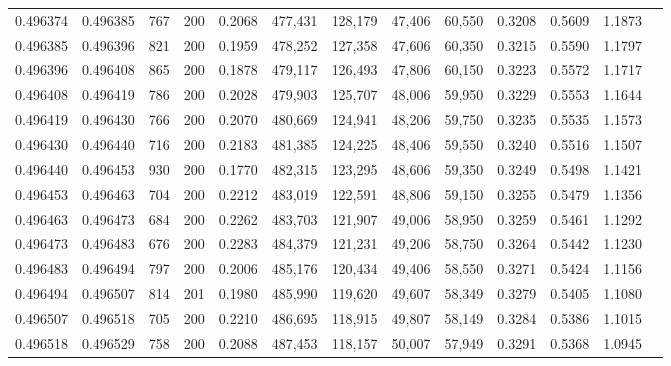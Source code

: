 \begin{tabular}{rrrrrrrrrrrrr}
0.496374 & 0.496385 &    767 & 200 &                                     0.2068 & 477,431 & 128,179 &  47,406 &  60,550 & 0.3208 & 0.5609 & 1.1873 \\
0.496385 & 0.496396 &    821 & 200 &                                     0.1959 & 478,252 & 127,358 &  47,606 &  60,350 & 0.3215 & 0.5590 & 1.1797 \\
0.496396 & 0.496408 &    865 & 200 &                                     0.1878 & 479,117 & 126,493 &  47,806 &  60,150 & 0.3223 & 0.5572 & 1.1717 \\
0.496408 & 0.496419 &    786 & 200 &                                     0.2028 & 479,903 & 125,707 &  48,006 &  59,950 & 0.3229 & 0.5553 & 1.1644 \\
0.496419 & 0.496430 &    766 & 200 &                                     0.2070 & 480,669 & 124,941 &  48,206 &  59,750 & 0.3235 & 0.5535 & 1.1573 \\
0.496430 & 0.496440 &    716 & 200 &                                     0.2183 & 481,385 & 124,225 &  48,406 &  59,550 & 0.3240 & 0.5516 & 1.1507 \\
0.496440 & 0.496453 &    930 & 200 &                                     0.1770 & 482,315 & 123,295 &  48,606 &  59,350 & 0.3249 & 0.5498 & 1.1421 \\
0.496453 & 0.496463 &    704 & 200 &                                     0.2212 & 483,019 & 122,591 &  48,806 &  59,150 & 0.3255 & 0.5479 & 1.1356 \\
0.496463 & 0.496473 &    684 & 200 &                                     0.2262 & 483,703 & 121,907 &  49,006 &  58,950 & 0.3259 & 0.5461 & 1.1292 \\
0.496473 & 0.496483 &    676 & 200 &                                     0.2283 & 484,379 & 121,231 &  49,206 &  58,750 & 0.3264 & 0.5442 & 1.1230 \\
0.496483 & 0.496494 &    797 & 200 &                                     0.2006 & 485,176 & 120,434 &  49,406 &  58,550 & 0.3271 & 0.5424 & 1.1156 \\
0.496494 & 0.496507 &    814 & 201 &                                     0.1980 & 485,990 & 119,620 &  49,607 &  58,349 & 0.3279 & 0.5405 & 1.1080 \\
0.496507 & 0.496518 &    705 & 200 &                                     0.2210 & 486,695 & 118,915 &  49,807 &  58,149 & 0.3284 & 0.5386 & 1.1015 \\
0.496518 & 0.496529 &    758 & 200 &                                     0.2088 & 487,453 & 118,157 &  50,007 &  57,949 & 0.3291 & 0.5368 & 1.0945 \\

\end{tabular}
